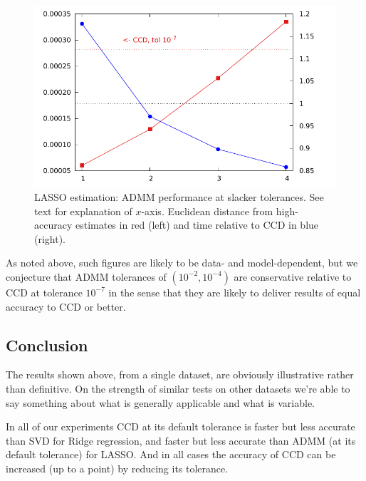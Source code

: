 \documentclass{article}
\begin{document}
\begin{figure}[htbp]
\begin{center}
\includegraphics[scale=0.9]{admm_ccd.pdf}
\caption{LASSO estimation: ADMM performance at slacker tolerances.
  See text for explanation of $x$-axis. Euclidean distance from
  high-accuracy estimates in red (left) and time relative to CCD in
  blue (right).}
\label{fig:admm-seq}
\end{center}
\end{figure}

As noted above, such figures are likely to be data- and
model-dependent, but we conjecture that ADMM tolerances of
$(10^{-2}, 10^{-4})$ are conservative relative to CCD at tolerance
$10^{-7}$ in the sense that they are likely to deliver results of
equal accuracy to CCD or better.

\subsection*{Conclusion}

The results shown above, from a single dataset, are obviously
illustrative rather than definitive. On the strength of similar tests
on other datasets we're able to say something about what is generally
applicable and what is variable.

In all of our experiments CCD at its default tolerance is faster but
less accurate than SVD for Ridge regression, and faster but less
accurate than ADMM (at its default tolerance) for LASSO. And in all
cases the accuracy of CCD can be increased (up to a point) by
reducing its tolerance.
\end{document}

